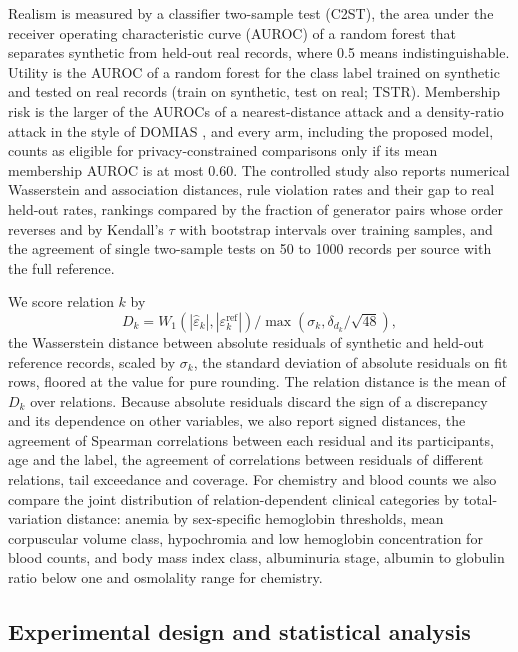 \documentclass[pdflatex,referee]{sn-jnl}%
\begin{document}
Realism is measured by a classifier two-sample test (C2ST), the area under the receiver operating characteristic curve (AUROC) of a random forest that separates synthetic from held-out real records, where 0.5 means indistinguishable. Utility is the AUROC of a random forest for the class label trained on synthetic and tested on real records (train on synthetic, test on real; TSTR). Membership risk is the larger of the AUROCs of a nearest-distance attack and a density-ratio attack in the style of DOMIAS \cite{vanbreugel2023domias}, and every arm, including the proposed model, counts as eligible for privacy-constrained comparisons only if its mean membership AUROC is at most 0.60. The controlled study also reports numerical Wasserstein and association distances, rule violation rates and their gap to real held-out rates, rankings compared by the fraction of generator pairs whose order reverses and by Kendall's $\tau$ with bootstrap intervals over training samples, and the agreement of single two-sample tests on 50 to 1000 records per source with the full reference.

We score relation $k$ by
\begin{equation}
D_k = W_1\!\left(|\hat{\varepsilon}_k|, |\varepsilon_k^{\mathrm{ref}}|\right) / \max\!\left(\sigma_k, \delta_{d_k}/\sqrt{48}\right),
\label{eq:metric}
\end{equation}
the Wasserstein distance between absolute residuals of synthetic and held-out reference records, scaled by $\sigma_k$, the standard deviation of absolute residuals on fit rows, floored at the value for pure rounding. The relation distance is the mean of $D_k$ over relations. Because absolute residuals discard the sign of a discrepancy and its dependence on other variables, we also report signed distances, the agreement of Spearman correlations between each residual and its participants, age and the label, the agreement of correlations between residuals of different relations, tail exceedance and coverage. For chemistry and blood counts we also compare the joint distribution of relation-dependent clinical categories by total-variation distance: anemia by sex-specific hemoglobin thresholds, mean corpuscular volume class, hypochromia and low hemoglobin concentration for blood counts, and body mass index class, albuminuria stage, albumin to globulin ratio below one and osmolality range for chemistry.

\subsection*{Experimental design and statistical analysis}
\end{document}
